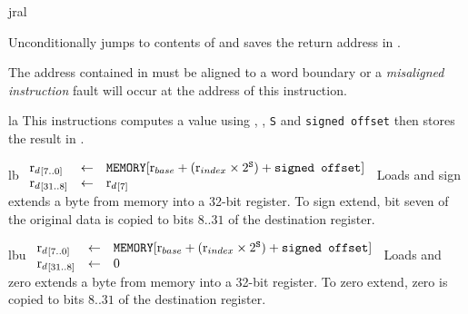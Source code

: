 \begin{instruction}{jral}\label{inst:jral}
  \jraltype
      {Unconditionally jumps to contents of  and saves the
        return address in \dr.

        The address contained in  must be aligned to a word
        boundary or a \emph{misaligned instruction} fault will
        occur at the address of this instruction.}
\end{instruction}


\begin{instruction}{la}
     {\laopc}
     {
       This instructions computes a value using , ,
       \texttt{S} and \texttt{signed offset} then stores the
       result in \dr.
     }
\end{instruction}


\begin{instruction}{lb}
     {\lbopc}
     {
       \begin{math}
         \begin{array}{lcl}
           {\ensuremath{\textrm{r}_{d}}}_{[7..0]} & \leftarrow & \texttt{MEMORY}[\textrm{r}_{base} +
            (\textrm{r}_{index} \times 2^{\texttt{S}}) + \texttt{signed offset}] \\
           {\textrm{r}_{d}}_{[31..8]} & \leftarrow & {\textrm{r}_{d}}_{[7]} \\
         \end{array}
       \end{math}
     }
     {
       Loads and sign extends a byte from memory into a 32-bit
       register.  To sign extend, bit seven of the original data
       is copied to bits ${8..31}$ of the destination register.
     }
\end{instruction}

\begin{instruction}{lbu}
     {\lbuopc}
     {
       \begin{math}
         \begin{array}{lcl}
           {\ensuremath{\textrm{r}_{d}}}_{[7..0]} & \leftarrow & \texttt{MEMORY}[\textrm{r}_{base} +
            (\textrm{r}_{index} \times 2^{\texttt{S}}) + \texttt{signed offset}] \\
           {\textrm{r}_{d}}_{[31..8]} & \leftarrow & 0 \\
         \end{array}
       \end{math}
     }
     {
       Loads and zero extends a byte from memory into a 32-bit
       register.  To zero extend, zero is copied to bits ${8..31}$
       of the destination register.
     }
\end{instruction}



